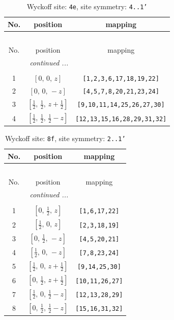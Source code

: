 \documentclass[fleqn,8pt]{jsarticle}
\begin{document}
\renewcommand{\arraystretch}{1.2}
\begin{longtable}{ccc}
\caption{Wyckoff site: {\tt 4e}, site symmetry: {\tt 4..1'}}
 \\
 \hline \hline
No. & position & mapping \\ \hline \endfirsthead

\multicolumn{2}{l}{\tablename\ \thetable{}} \\
 \hline \hline
No. & position & mapping \\ \hline \endhead

 \hline \hline
\multicolumn{2}{r}{\footnotesize\it continued ...} \\ \endfoot

 \hline \hline
\multicolumn{2}{r}{} \\ \endlastfoot

1 & $\left[ 0,\, 0,\, z \right]$ & {\tt [1,2,3,6,17,18,19,22]} \\ \hline
2 & $\left[ 0,\, 0,\, - z \right]$ & {\tt [4,5,7,8,20,21,23,24]} \\ \hline
3 & $\left[ \frac{1}{2},\, \frac{1}{2},\, z + \frac{1}{2} \right]$ & {\tt [9,10,11,14,25,26,27,30]} \\ \hline
4 & $\left[ \frac{1}{2},\, \frac{1}{2},\, \frac{1}{2} - z \right]$ & {\tt [12,13,15,16,28,29,31,32]} \\
\end{longtable}
\renewcommand{\arraystretch}{1.2}
\begin{longtable}{ccc}
\caption{Wyckoff site: {\tt 8f}, site symmetry: {\tt 2..1'}}
 \\
 \hline \hline
No. & position & mapping \\ \hline \endfirsthead

\multicolumn{2}{l}{\tablename\ \thetable{}} \\
 \hline \hline
No. & position & mapping \\ \hline \endhead

 \hline \hline
\multicolumn{2}{r}{\footnotesize\it continued ...} \\ \endfoot

 \hline \hline
\multicolumn{2}{r}{} \\ \endlastfoot

1 & $\left[ 0,\, \frac{1}{2},\, z \right]$ & {\tt [1,6,17,22]} \\ \hline
2 & $\left[ \frac{1}{2},\, 0,\, z \right]$ & {\tt [2,3,18,19]} \\ \hline
3 & $\left[ 0,\, \frac{1}{2},\, - z \right]$ & {\tt [4,5,20,21]} \\ \hline
4 & $\left[ \frac{1}{2},\, 0,\, - z \right]$ & {\tt [7,8,23,24]} \\ \hline
5 & $\left[ \frac{1}{2},\, 0,\, z + \frac{1}{2} \right]$ & {\tt [9,14,25,30]} \\ \hline
6 & $\left[ 0,\, \frac{1}{2},\, z + \frac{1}{2} \right]$ & {\tt [10,11,26,27]} \\ \hline
7 & $\left[ \frac{1}{2},\, 0,\, \frac{1}{2} - z \right]$ & {\tt [12,13,28,29]} \\ \hline
8 & $\left[ 0,\, \frac{1}{2},\, \frac{1}{2} - z \right]$ & {\tt [15,16,31,32]} \\
\end{longtable}
\end{document}
